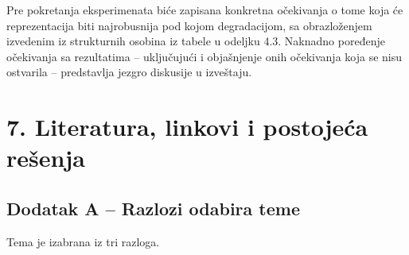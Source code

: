 \documentclass[11pt,a4paper]{article}
\begin{document}
Pre pokretanja eksperimenata biće zapisana konkretna očekivanja o tome koja će reprezentacija biti najrobusnija pod kojom degradacijom, sa obrazloženjem izvedenim iz strukturnih osobina iz tabele u odeljku 4.3. Naknadno poređenje očekivanja sa rezultatima -- uključujući i objašnjenje onih očekivanja koja se nisu ostvarila -- predstavlja jezgro diskusije u izveštaju.

\section*{7. Literatura, linkovi i postojeća rešenja}


\nocite{szeliski, milosavljevic, laganiere}


\newpage

\subsection*{Dodatak A -- Razlozi odabira teme}

Tema je izabrana iz tri razloga.
\end{document}
